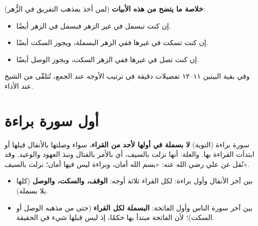 \begin{tahrir}
\medskip
\textbf{خلاصة ما يتضح من هذه الأبيات} (لمن أخذ بمذهب التفريق في الزُّهر):
\begin{itemize}
\item إن كنت تبسمل في غير الزهر \ila{} فبسمل في الزهر أيضًا.
\item إن كنت تسكت في غيرها \ila{} ففي الزهر البسملة، ويجوز السكت أيضًا.
\item إن كنت تصل في غيرها \ila{} ففي الزهر السكت، ويجوز الوصل أيضًا.
\end{itemize}
وفي بقية البيتين ١١–١٢ تفصيلات دقيقة في ترتيب الأوجه عند الجمع، تُتلقّى من الشيخ عند الأداء.
\end{tahrir}

\section{أول سورة براءة}

\begin{mufradat}
\end{mufradat}
\maana سورة براءة (التوبة) \textbf{لا بسملة في أولها لأحد من القراء}، سواء وصلتها بالأنفال قبلها أو ابتدأت القراءة بها. والعلة: أنها نزلت بالسيف، أي بالأمر بالقتال ونبذ العهود والوعيد. وقد نُقل عن علي رضي الله عنه: «بسم الله أمان، وبراءة ليس فيها أمان؛ نزلت بالسيف».

\begin{tahrir}
\medskip
\begin{itemize}
\item بين آخر الأنفال  وأول براءة: لكل القراء ثلاثة أوجه: \textbf{الوقف، والسكت، والوصل} (كلها بلا بسملة).
\item بين آخر سورة الناس وأول الفاتحة: \textbf{البسملة لكل القراء} (حتى من مذهبه الوصل أو السكت)؛ لأن الفاتحة مبتدأ بها حكمًا، إذ ليس قبلها شيء في الحقيقة.
\end{itemize}
\end{tahrir}

